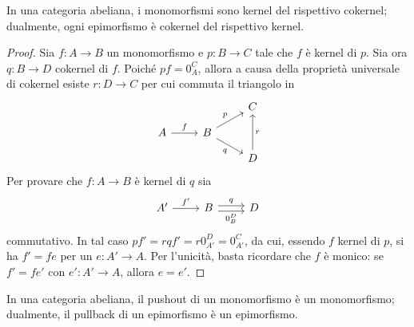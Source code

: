\begin{proposition}\label{proposition:MonoIsKerOfItsCoker} 
  In una categoria abeliana, i monomorfismi sono kernel del rispettivo
  cokernel; dualmente, ogni epimorfismo è cokernel del rispettivo kernel.
\end{proposition}

\begin{proof}
  Sia \(f : A \to B\) un monomorfismo e \(p : B \to C\) tale che \(f\) è
  kernel di \(p\). Sia ora \(q : B \to D\) cokernel di \(f\). Poiché
  \(p f = 0_A^C\), allora a causa della proprietà universale di cokernel
  esiste \(r : D \to C\) per cui commuta il triangolo in
  \[
    \begin{tikzcd}[row sep=small]
      & & C \\
      A \ar["{f}", r] & B \ar["{p}", ur] \ar["{q}", dr, swap] \\
      & & D \ar["{r}", uu, swap]
    \end{tikzcd}
  \]
  Per provare che \(f : A \to B\) è kernel di \(q\) sia
  \[
    \begin{tikzcd}
      A' \ar["{f'}", r] & B \ar["{q}", r, shift left] \ar["{0_B^D}", r,
      shift right, swap] & D
    \end{tikzcd}
  \]
  commutativo. In tal caso \(pf' = rqf' = r 0_{A'}^D = 0_{A'}^C\), da
  cui, essendo \(f\) kernel di \(p\), si ha \(f' = f e\) per un
  \(e : A' \to A\). Per l'unicità, basta ricordare che \(f\) è monico: se
  \(f' = fe'\) con \(e' : A' \to A\), allora \(e = e'\).
\end{proof}

\begin{proposition}\label{proposition:PushotMonoIsMono}
  In una categoria abeliana, il pushout di un monomorfismo è un
  monomorfismo; dualmente, il pullback di un epimorfismo è un epimorfismo.
\end{proposition}

